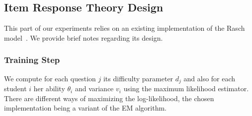 \documentclass{edm_template}
\begin{document}
%


\subsection{Item Response Theory Design}

This part of our experiments relies on an existing implementation of the Rasch model~\cite{Rizopoulos2006}. We provide brief notes regarding its design.

\subsubsection{Training Step}

We compute for each question $j$ its difficulty parameter $d_j$ and also for each student $i$ her ability $\theta_i$ and variance $v_i$ using the maximum likelihood estimator. There are different ways of maximizing the log-likelihood, the chosen implementation being a variant of the EM algorithm. %
\end{document}
